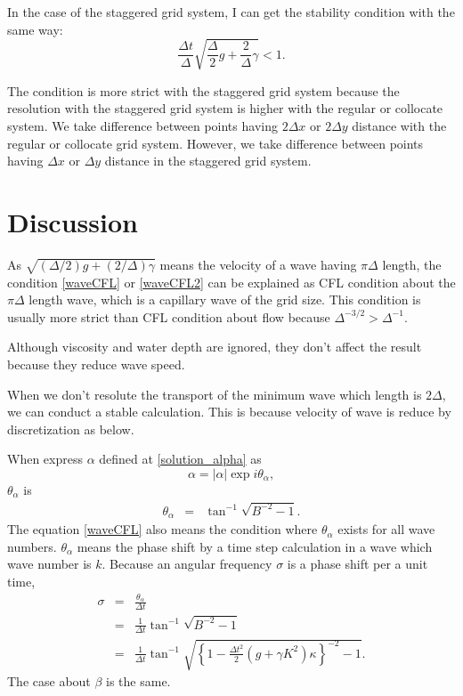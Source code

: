 \documentclass[a4paper,11pt]{article}
\begin{document}
In the case of the staggered grid system, I can get the stability condition with the same way:
\begin{equation}
\frac{\Delta t}{\Delta}\sqrt{\frac{\Delta}{2}g +
\frac{2}{\Delta}\gamma} < 1. \label{waveCFL2}
\end{equation}

The condition is more strict with the staggered grid system because the resolution with the staggered grid system is higher with the regular or collocate system.
We take difference between points having $2\Delta x$ or $2\Delta y$ distance with the regular or collocate grid system. However, we take difference between points having $\Delta x$ or $\Delta y$ distance in the staggered grid system.

\section{Discussion}

As $\sqrt{(\Delta /2)g + (2/\Delta)\gamma}$ means the velocity of a wave having $\pi\Delta$ length,
the condition \eqref{waveCFL} or \eqref{waveCFL2} can be explained as CFL condition about the $\pi\Delta$ length wave, which is a capillary wave of the grid size.
This condition is usually more strict than CFL condition about flow because $\Delta^{-3/2} > \Delta^{-1}$.

Although viscosity and water depth are ignored, they don't affect the result because they reduce wave speed.

When we don't resolute the transport of the minimum wave which length is $2\Delta$, we can conduct a stable calculation. This is because velocity of wave is reduce by discretization as below.

When express $\alpha$ defined at \eqref{solution_alpha} as
\begin{equation}
\alpha = |\alpha|\exp{i\theta_\alpha},
\end{equation}
$\theta_\alpha$ is
\begin{eqnarray}
\theta_\alpha &=& \tan^{-1} \sqrt{B^{-2}-1}.
\end{eqnarray}
The equation \eqref{waveCFL} also means the condition where $\theta_\alpha$ exists for all wave numbers.
$\theta_\alpha$ means the phase shift by a time step calculation in a wave which wave number is $k$.
Because an angular frequency $\sigma$ is a phase shift per a unit time,
\begin{eqnarray}
\sigma &=& \frac{\theta_\alpha}{\Delta t} \\
&=& \frac{1}{\Delta t}\tan^{-1} \sqrt{B^{-2}-1} \\
&=& \frac{1}{\Delta t}\tan^{-1} \sqrt{\left\{1 - \frac{\Delta
				      t^2}{2}\left(g +\gamma K^2\right)\kappa\right\}^{-2}-1}.
\label{DescritizeAngularFrequency}
\end{eqnarray}
The case about $\beta$ is the same.
\end{document}
